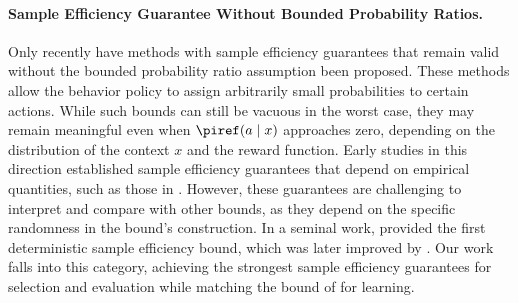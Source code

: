 %


\paragraph{Sample Efficiency Guarantee Without Bounded Probability Ratios.}
Only recently have methods with sample efficiency guarantees that remain valid without the bounded probability ratio assumption been proposed. These methods allow the behavior policy to assign arbitrarily small probabilities to certain actions.
While such bounds can still be vacuous in the worst case, they may remain meaningful even when $\piref(a\mid x)$ approaches zero, depending on the distribution of the context $x$ and the reward function.
Early studies in this direction established sample efficiency guarantees that depend on empirical quantities, such as those in \citet[Theorem 4.1]{jin22policy}. However, these guarantees are challenging to interpret and compare with other bounds, as they depend on the specific randomness in the bound’s construction.
In a seminal work, \citet{gabbianelli24importance} provided the first deterministic sample efficiency bound, which was later improved by \citet{sakhi24logarithmic}.
Our work falls into this category, achieving the strongest sample efficiency guarantees for selection and evaluation while matching the bound of \citet{sakhi24logarithmic} for learning.
